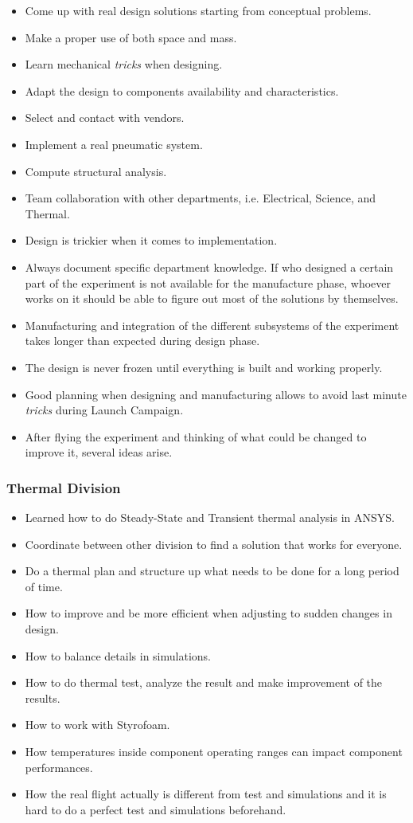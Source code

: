 \begin{itemize}
    \item Come up with real design solutions starting from conceptual problems.
    \item Make a proper use of both space and mass.
    \item Learn mechanical \textit{tricks} when designing.
    \item Adapt the design to components availability and characteristics.
    \item Select and contact with vendors.
    \item Implement a real pneumatic system. 
    \item Compute structural analysis.
    \item Team collaboration with other departments, i.e. Electrical, Science, and Thermal.
    \item Design is trickier when it comes to implementation.
    \item Always document specific department knowledge. If who designed a certain part of the experiment is not available for the manufacture phase, whoever works on it should be able to figure out most of the solutions by themselves.
    \item Manufacturing and integration of the different subsystems of the experiment takes longer than expected during design phase.
    \item The design is never frozen until everything is built and working properly.
    \item Good planning when designing and manufacturing allows to avoid last minute \textit{tricks} during Launch Campaign.
    \item After flying the experiment and thinking of what could be changed to improve it, several ideas arise.
\end{itemize}

\subsubsection{Thermal Division}
\begin{itemize}
    \item Learned how to do Steady-State and Transient thermal analysis in ANSYS.
    \item Coordinate between other division to find a solution that works for everyone.
    \item Do a thermal plan and structure up what needs to be done for a long period of time.
    \item How to improve and be more efficient when adjusting to sudden changes in design.
    \item How to balance details in simulations.
    \item How to do thermal test, analyze the result and make improvement of the results.
    \item How to work with Styrofoam.
    \item How temperatures inside component operating ranges can impact component performances.
    \item How the real flight actually is different from test and simulations and it is hard to do a perfect test and simulations beforehand.
\end{itemize}